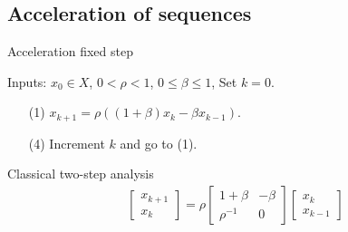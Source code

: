 \documentclass[english,12pt,a4paper]{article}
\begin{document}
%
\subsection{Acceleration of sequences}\label{subsec:}
%
%
\begin{yellow}
\begin{algorithm}[H]
\caption{Acceleration fixed step} 
\label{algorithm:Descent} 
%
Inputs: $x_0\in X$, $0<\rho<1$, $0\le \beta \le 1$, Set $k=0$.
%
\begin{itemize}
\item[(1)] $x_{k+1} = \rho((1+\beta)x_k - \beta x_{k-1})$.
\item[(4)] Increment $k$ and go to (1).
\end{itemize}
%
\end{algorithm}
\end{yellow}

Classical two-step analysis
%
\begin{align*}
\begin{bmatrix}
x_{k+1} \\ x_{k}
\end{bmatrix}
=
\rho
\begin{bmatrix}
1+ \beta & -\beta\\ \rho^{-1}&0
\end{bmatrix}
\begin{bmatrix}
x_{k} \\ x_{k-1}
\end{bmatrix}
\end{align*}
\end{document}
